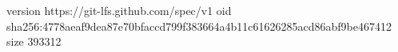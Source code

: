 version https://git-lfs.github.com/spec/v1
oid sha256:4778aeaf9dea87e70bfaccd799f383664a4b11c61626285acd86abf9be467412
size 393312
